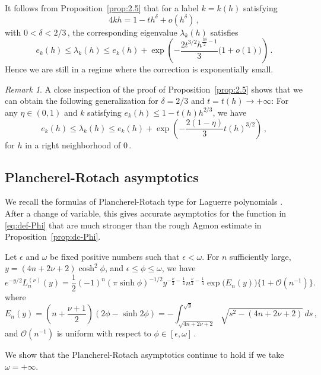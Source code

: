 \documentclass[11pt]{amsart}
\numberwithin{equation}{section}
\theoremstyle{remark}
\newtheorem{remark}[theorem]{Remark}
\newcommand{\mn}{\medskip\noindent}
\begin{document}
It follows from Proposition~\ref{prop:2.5} that for 
a label $k=k(h)$ satisfying 
\[4kh=1-th^{\delta} +o(h^\delta)\,,\]
with $0<\delta<2/3\,$,
the corresponding eigenvalue $\lambda_k(h)$ satisfies
\begin{equation}
e_k(h)\leq \lambda_k(h)\leq e_k(h)+\exp\left(-\frac{2t^{3/2}h^{\frac{3\delta}{2}-1}}{3}\bigl(1+o(1)\bigr)\right)\,.
\end{equation}
Hence we are still in a regime where the correction is exponentially small.

\begin{remark}\label{rem:2.6}
A close inspection of the proof of Proposition~\ref{prop:2.5} shows that we can obtain the following generalization for $\delta =2/3$ and $t=t(h)\to+\infty$: For any $\eta\in(0,1)$ and $k$ satisfying
$e_k(h)\leq 1-t(h)h^{2/3}$, we have
\[e_k(h)\leq \lambda_k(h)\leq e_k(h) + \exp\left(-\frac{2(1-\eta)}{3}t(h)^{3/2}\right)\,,\]
for $h$ in a right neighborhood of $0\,$.
\end{remark}
\subsection{Plancherel-Rotach asymptotics}\label{subsec:Plancherel-Rotach}
%
%
%
%

We recall the formulas of Plancherel-Rotach type for Laguerre polynomials \cite[Theorem~8.22.8\,(b)]{Szego}. After a change of variable, this gives accurate asymptotics for the function in \eqref{eq:def-Phi} that are much  stronger than the rough Agmon estimate in Proposition~\ref{prop:dc-Phi}.

Let $\epsilon$ and $\omega$ be fixed positive numbers
 such that $\epsilon < \omega$. For $n$ sufficiently large,
$y = (4n + 2\nu + 2) \cosh^2 \phi$, and $\epsilon \leq \phi \leq \omega$, we have
%
\begin{equation}\label{eq:Plancherel-Rotach}
e^{-y/2} L_n^{(\nu)}(y) = \frac{1}{2} (-1)^n (\pi \sinh \phi)^{-1/2} y^{-\frac{\nu}{2} - \frac{1}{4}} n^{\frac{\nu}{2} - \frac{1}{4}} \exp\bigl(E_n(y)\bigr)\bigl\{ 1 +\mathcal  O(n^{-1}) \bigr\}.
\end{equation}
%
where
\[
E_n(y) = \left(n + \frac{\nu+1}{2}\right)(2\phi - \sinh 2\phi)=
-\int_{\sqrt{4n + 2\nu + 2}}^{\sqrt{y}} \sqrt{s^2 - (4n + 2\nu + 2)} \, ds\,,
\]
and $\mathcal O(n^{-1})$ is uniform with respect to $\phi\in [\epsilon,\omega]\,$.\mn

 We show that the Plancherel-Rotach asymptotics continue to hold if we take $\omega=+\infty$.
\end{document}
